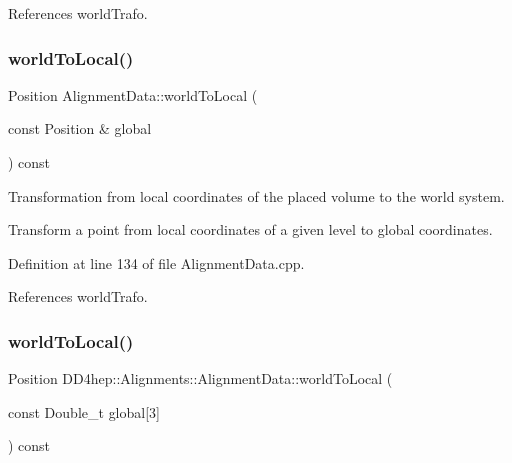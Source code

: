 References world\+Trafo.

\hypertarget{class_d_d4hep_1_1_alignments_1_1_alignment_data_a7ffad9495bb924203e294f96f20d9453}{}\label{class_d_d4hep_1_1_alignments_1_1_alignment_data_a7ffad9495bb924203e294f96f20d9453} 
\subsubsection{\texorpdfstring{world\+To\+Local()}{worldToLocal()}\hspace{0.1cm}{\footnotesize\ttfamily [3/4]}}
{\footnotesize\ttfamily Position Alignment\+Data\+::world\+To\+Local (\begin{DoxyParamCaption}\item[{const Position \&}]{global }\end{DoxyParamCaption}) const}



Transformation from local coordinates of the placed volume to the world system. 

Transform a point from local coordinates of a given level to global coordinates. 

Definition at line 134 of file Alignment\+Data.\+cpp.



References world\+Trafo.

\hypertarget{class_d_d4hep_1_1_alignments_1_1_alignment_data_af6e227ee69afb3dbf1d50463c12ec106}{}\label{class_d_d4hep_1_1_alignments_1_1_alignment_data_af6e227ee69afb3dbf1d50463c12ec106} 
\subsubsection{\texorpdfstring{world\+To\+Local()}{worldToLocal()}\hspace{0.1cm}{\footnotesize\ttfamily [4/4]}}
{\footnotesize\ttfamily Position D\+D4hep\+::\+Alignments\+::\+Alignment\+Data\+::world\+To\+Local (\begin{DoxyParamCaption}\item[{const Double\+\_\+t}]{global\mbox{[}3\mbox{]} }\end{DoxyParamCaption}) const\hspace{0.3cm}{\ttfamily [inline]}}



